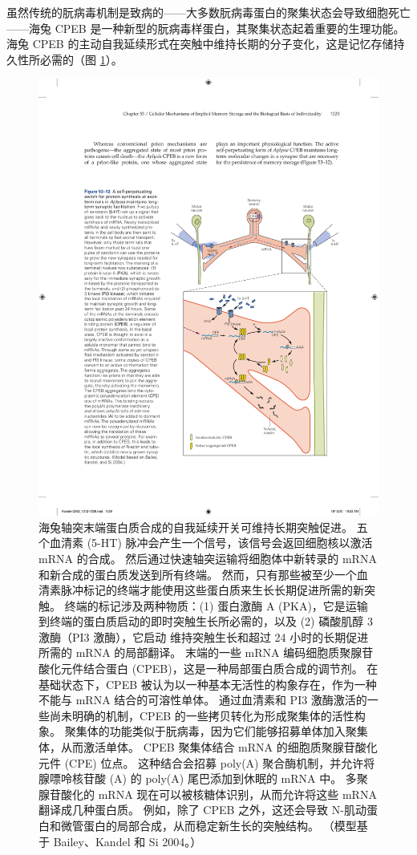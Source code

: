 虽然传统的朊病毒机制是致病的——大多数朊病毒蛋白的聚集状态会导致细胞死亡——海兔 CPEB 是一种新型的朊病毒样蛋白，其聚集状态起着重要的生理功能。
海兔 CPEB 的主动自我延续形式在突触中维持长期的分子变化，这是记忆存储持久性所必需的（图 \ref{fig:53_12}）。


\begin{figure}[htbp]
	\centering
	\includegraphics[width=0.7\linewidth]{chap53/fig_53_12}
	\caption{海兔轴突末端蛋白质合成的自我延续开关可维持长期突触促进。 五个血清素 (5-HT) 脉冲会产生一个信号，该信号会返回细胞核以激活 mRNA 的合成。 然后通过快速轴突运输将细胞体中新转录的 mRNA 和新合成的蛋白质发送到所有终端。 然而，只有那些被至少一个血清素脉冲标记的终端才能使用这些蛋白质来生长长期促进所需的新突触。 终端的标记涉及两种物质：(1) 蛋白激酶 A (PKA)，它是运输到终端的蛋白质启动的即时突触生长所必需的，以及 (2) 磷酸肌醇 3 激酶（PI3 激酶），它启动 维持突触生长和超过 24 小时的长期促进所需的 mRNA 的局部翻译。 末端的一些 mRNA 编码细胞质聚腺苷酸化元件结合蛋白 (CPEB)，这是一种局部蛋白质合成的调节剂。 在基础状态下，CPEB 被认为以一种基本无活性的构象存在，作为一种不能与 mRNA 结合的可溶性单体。 通过血清素和 PI3 激酶激活的一些尚未明确的机制，CPEB 的一些拷贝转化为形成聚集体的活性构象。 聚集体的功能类似于朊病毒，因为它们能够招募单体加入聚集体，从而激活单体。 CPEB 聚集体结合 mRNA 的细胞质聚腺苷酸化元件 (CPE) 位点。 这种结合会招募 poly(A) 聚合酶机制，并允许将腺嘌呤核苷酸 (A) 的 poly(A) 尾巴添加到休眠的 mRNA 中。 多聚腺苷酸化的 mRNA 现在可以被核糖体识别，从而允许将这些 mRNA 翻译成几种蛋白质。 例如，除了 CPEB 之外，这还会导致 N-肌动蛋白和微管蛋白的局部合成，从而稳定新生长的突触结构。 （模型基于 Bailey、Kandel 和 Si 2004。）}
	\label{fig:53_12}
\end{figure}


